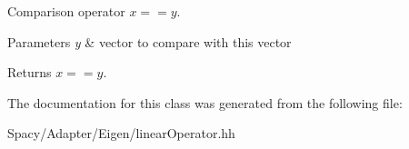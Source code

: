 Comparison operator $ x==y$. 


\begin{DoxyParams}{Parameters}
{\em y} & vector to compare with this vector \\
\hline
\end{DoxyParams}
\begin{DoxyReturn}{Returns}
$ x==y$. 
\end{DoxyReturn}


The documentation for this class was generated from the following file\+:\begin{DoxyCompactItemize}
\item 
Spacy/\+Adapter/\+Eigen/linear\+Operator.\+hh\end{DoxyCompactItemize}
